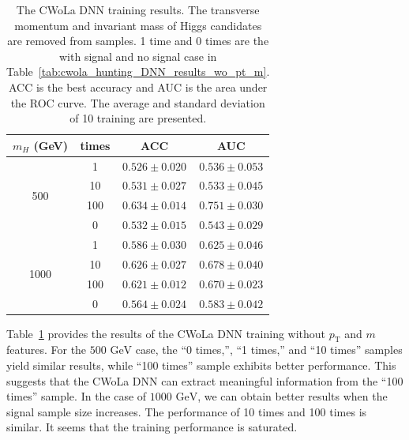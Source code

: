 \documentclass[12pt]{article}
\begin{document}
        \begin{table}[htpb]
            \centering
            \caption{The CWoLa DNN training results. The transverse momentum and invariant mass of Higgs candidates are removed from samples. 1 time and 0 times are the with signal and no signal case in Table~\ref{tab:cwola_hunting_DNN_results_wo_pt_m}. ACC is the best accuracy and AUC is the area under the ROC curve. The average and standard deviation of 10 training are presented.}
            \label{tab:cwola_hunting_DNN_results_wo_pt_m_enlarge_signal_size}
            \begin{tabular}{c|c|cc}
                $m_H$ (GeV)           & times & ACC               & AUC               \\ \hline
                \multirow{4}{*}{500}  & 1     & $0.526 \pm 0.020$ & $0.536 \pm 0.053$ \\
                                      & 10    & $0.531 \pm 0.027$ & $0.533 \pm 0.045$ \\
                                      & 100   & $0.634 \pm 0.014$ & $0.751 \pm 0.030$ \\
                                      & 0     & $0.532 \pm 0.015$ & $0.543 \pm 0.029$ \\ \hline
                \multirow{4}{*}{1000} & 1     & $0.586 \pm 0.030$ & $0.625 \pm 0.046$ \\
                                      & 10    & $0.626 \pm 0.027$ & $0.678 \pm 0.040$ \\
                                      & 100   & $0.621 \pm 0.012$ & $0.670 \pm 0.023$ \\
                                      & 0     & $0.564 \pm 0.024$ & $0.583 \pm 0.042$
            \end{tabular}
        \end{table}

        Table~\ref{tab:cwola_hunting_DNN_results_wo_pt_m_enlarge_signal_size} provides the results of the CWoLa DNN training without $p_{\text{T}}$ and $m$ features. For the $\text{500 GeV}$ case, the ``0 times,'', ``1 times,'' and ``10 times'' samples yield similar results, while ``100 times'' sample exhibits better performance. This suggests that the CWoLa DNN can extract meaningful information from the ``100 times'' sample. In the case of $\text{1000 GeV}$, we can obtain better results when the signal sample size increases. The performance of 10 times and 100 times is similar. It seems that the training performance is saturated. 
\end{document}

